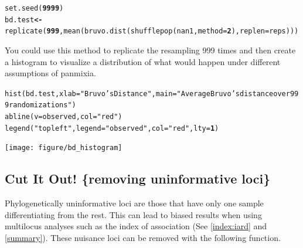 \documentclass[letterpaper]{article}\usepackage[]{graphicx}\usepackage[]{color}
\makeatletter
\newcommand{\hlnum}[1]{\textcolor[rgb]{0.502,0,0.502}{\textbf{#1}}}%
\newcommand{\hlstr}[1]{\textcolor[rgb]{0.651,0.522,0}{#1}}%
\newcommand{\hlstd}[1]{\textcolor[rgb]{0,0,0}{#1}}%
\newcommand{\hlkwb}[1]{\textcolor[rgb]{0.502,0.502,0.753}{\textbf{#1}}}%
\newcommand{\hlkwc}[1]{\textcolor[rgb]{0,0.502,0.753}{#1}}%
\newcommand{\hlkwd}[1]{\textcolor[rgb]{0,0.267,0.4}{#1}}%
\newenvironment{kframe}{%
 \def\at@end@of@kframe{}%
 \ifinner\ifhmode%
  \def\at@end@of@kframe{\end{minipage}}%
  \begin{minipage}{\columnwidth}%
 \fi\fi%
 \def\FrameCommand##1{\hskip\@totalleftmargin \hskip-\fboxsep
 \colorbox{shadecolor}{##1}\hskip-\fboxsep
     \hskip-\linewidth \hskip-\@totalleftmargin \hskip\columnwidth}%
 \MakeFramed {\advance\hsize-\width
   \@totalleftmargin\z@ \linewidth\hsize
   \@setminipage}}%
 {\par\unskip\endMakeFramed%
 \at@end@of@kframe}
\newenvironment{knitrout}{}{} %
\newcommand{\tab}{\hspace*{1em}}
\makeatother
\begin{document}
\begin{knitrout}\footnotesize
{}\color{fgcolor}\begin{kframe}
\begin{alltt}
\hlkwd{set.seed}\hlstd{(}\hlnum{9999}\hlstd{)}
\hlstd{bd.test} \hlkwb{<-} \hlkwd{replicate}\hlstd{(}\hlnum{999}\hlstd{,} \hlkwd{mean}\hlstd{(}\hlkwd{bruvo.dist}\hlstd{(}\hlkwd{shufflepop}\hlstd{(nan1,} \hlkwc{method} \hlstd{=} \hlnum{2}\hlstd{),} \hlkwc{replen} \hlstd{= reps)))}
\end{alltt}
\end{kframe}
\end{knitrout}



You could use this method to replicate the resampling 999 times and then create a histogram to visualize a distribution of what would happen under different assumptions of panmixia.

\begin{knitrout}\footnotesize
{}\color{fgcolor}\begin{kframe}
\begin{alltt}
\hlkwd{hist}\hlstd{(bd.test,} \hlkwc{xlab} \hlstd{=} \hlstr{"Bruvo's Distance"}\hlstd{,} \hlkwc{main} \hlstd{=} \hlstr{"Average Bruvo's distance over 999 randomizations"}\hlstd{)}
\hlkwd{abline}\hlstd{(}\hlkwc{v} \hlstd{= observed,} \hlkwc{col} \hlstd{=} \hlstr{"red"}\hlstd{)}
\hlkwd{legend}\hlstd{(}\hlstr{"topleft"}\hlstd{,} \hlkwc{legend} \hlstd{=} \hlstr{"observed"}\hlstd{,} \hlkwc{col} \hlstd{=} \hlstr{"red"}\hlstd{,} \hlkwc{lty} \hlstd{=} \hlnum{1}\hlstd{)}
\end{alltt}
\end{kframe}

{\centering \texttt{[image: figure/bd\_histogram]} 

}



\end{knitrout}


\subsection{Cut It Out!  \{removing uninformative loci\}}\label{data.manip:informloci}
 \tab\tab Phylogenetically uninformative loci are those that have only one sample differentiating from the rest. This can lead to biased results when using multilocus analyses such as the index of association (See \ref{index:iard} and \ref{summary}). These nuisance loci can be removed with the following function.
\end{document}
